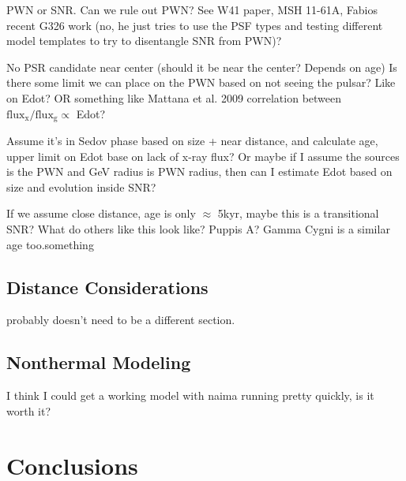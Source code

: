 \documentclass[preprint2]{aastex}
\begin{document}
PWN or SNR. Can we rule out PWN? See W41 paper, MSH 11-61A, Fabios recent G326 work (no, he just tries to use the PSF types and testing different model templates to try to disentangle SNR from PWN)?

No PSR candidate near center (should it be near the center? Depends on age)
Is there some limit we can place on the PWN based on not seeing the pulsar? Like on Edot? OR something like Mattana et al. 2009 correlation between  $\mathrm{flux_x / flux_g \propto}$   Edot? 

Assume it's in Sedov phase based on size + near distance, and calculate age, upper limit on Edot base on lack of x-ray flux? Or maybe if I assume the sources is the PWN and GeV radius is PWN radius, then can I estimate Edot based on size and evolution inside  SNR?

If we assume close distance, age is only $\approx$ 5kyr, maybe this is a transitional SNR? What do others like this look like? Puppis A? Gamma Cygni is a similar age too.something 


\subsection{\label{sec:Dist}Distance Considerations}
probably doesn't need to be a different section. 
\subsection{\label{secModel}Nonthermal Modeling}
I think I could get a working model with naima running pretty quickly, is it worth it?
%
%
\section{\label{sec:Conc}Conclusions}



%
%


%

\end{document}
